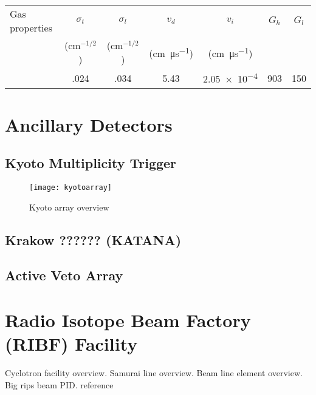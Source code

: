 \begin{table}[!htp] %
\centering %
\begin{tabular}{
  @{}
  l
  S[table-format=1.2]
  S[table-format=1.2]
  S[table-format=1.2]
  S[table-format=1.2]
  S[table-format=5.2]
  S[table-format=5.2]
  @{}
}
\toprule
Gas properties &
 {$\sigma_{t}$} &
 {$\sigma_{l}$} &
 {$v_{d}$} &
 {$v_{i}$}  &
 {$G_{h}$} &
 {$G_{l}$} \\
&
  {($\si{\centi\meter}^{-1/2}$)} &
  {($\si{\centi\meter}^{-1/2}$)} &
  {(\si{\centi\meter\per\micro\second})} &
 {(\si{\centi\meter\per\micro\second})} \\

\midrule
\phantom{abc}   &.024   &.034  &5.43  &  \num{2.05e-4} &  903   &150     \\
\bottomrule
\end{tabular}

\caption{}
\label{tb:gasprop}
\end{table}




\section{Ancillary Detectors }


\subsection{Kyoto Multiplicity Trigger}


\begin{figure}[!htb]
\texttt{[image: kyotoarray]}
\label{fig:kyoto}
\caption{Kyoto array overview}
\end{figure}


\subsection{Krakow ?????? (KATANA)}


\subsection{Active Veto Array}

\section{Radio Isotope Beam Factory (RIBF) Facility }
Cyclotron facility overview.
Samurai line overview.
Beam line element overview.
Big rips beam PID. reference 


